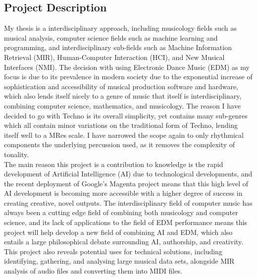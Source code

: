 \documentclass{article}
\begin{document}
\subsection{Project Description}
My thesis is a interdisciplinary approach, including musicology fields such as musical analysis, computer science fields such as machine learning and programming, and interdisciplinary sub-fields such as Machine Information Retrieval (MIR), Human-Computer Interaction (HCI), and New Musical Interfaces (NMI). The decision with using Electronic Dance Music (EDM) as my focus is due to its prevalence in modern society due to the exponential increase of sophistication and accessibility of musical production software and hardware, which also lends itself nicely to a genre of music that itself is interdisciplinary, combining computer science, mathematics, and musicology. The reason I have decided to go with Techno is its overall simplicity, yet contains many sub-genres which all contain minor variations on the traditional form of Techno, lending itself well to a MRes scale. I have narrowed the scope again to only rhythmical components the underlying percussion used, as it removes the complexity of tonality.\\
The main reason this project is a contribution to knowledge is the rapid development of Artificial Intelligence (AI) due to technological developments, and the recent deployment of Google's Magenta project means that this high level of AI development is becoming more accessible with a higher degree of success in creating creative, novel outputs. The interdisciplinary field of computer music has always been a cutting edge field of combining both musicology and computer science, and its lack of applications to the field of EDM performance means this project will help develop a new field of combining AI and EDM, which also entails a large philosophical debate surrounding AI, authorship, and creativity. \\
This project also reveals potential uses for technical solutions, including identifying, gathering, and analysing large musical data sets, alongside MIR analysis of audio files and converting them into MIDI files. 
\end{document}
